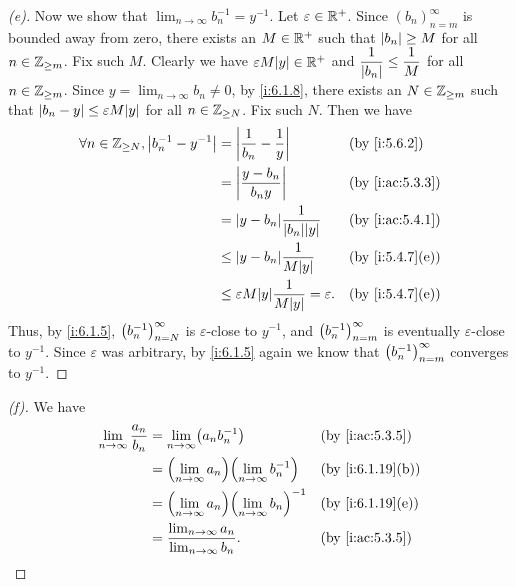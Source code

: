 \begin{proof}[(e)]
  Now we show that \(\lim_{n \to \infty} b_n^{-1} = y^{-1}\).
  Let \(\varepsilon \in \mathbb{R}^+\).
  Since \((b_n)_{n = m}^\infty\) is bounded away from zero, there exists an \(M \in \mathbb{R}^+\) such that \(\left\lvert b_n\right\rvert \geq M\) for all \(n \in \mathbb{Z}_{\geq m}\).
  Fix such \(M\).
  Clearly we have \(\varepsilon M \abs{y} \in \R^+\) and \(\dfrac{1}{\left\lvert b_n\right\rvert} \leq \dfrac{1}{M}\) for all \(n \in \mathbb{Z}_{\geq m}\).
  Since \(y = \lim_{n \to \infty} b_n \neq 0\), by \cref{i:6.1.8}, there exists an \(N \in \mathbb{Z}_{\geq m}\) such that \(\abs{b_n - y} \leq \varepsilon M \abs{y}\) for all \(n \in \mathbb{Z}_{\geq N}\).
  Fix such \(N\).
  Then we have
  \begin{align*}
    \forall n \in \Z_{\geq N}, \abs{b_n^{-1} - y^{-1}} & = \abs{\dfrac{1}{b_n} - \dfrac{1}{y}}                       &  & \by{i:5.6.2}    \\
                                                       & = \abs{\dfrac{y - b_n}{b_n y}}                              &  & \by{i:ac:5.3.3} \\
                                                       & = \abs{y - b_n}\dfrac{1}{\abs{b_n}\abs{y}}                  &  & \by{i:ac:5.4.1} \\
                                                       & \leq \abs{y - b_n}\dfrac{1}{M\abs{y}}                       &  & \by{i:5.4.7}[e] \\
                                                       & \leq \varepsilon M\abs{y}\dfrac{1}{M\abs{y}} = \varepsilon. &  & \by{i:5.4.7}[e]
  \end{align*}
  Thus, by \cref{i:6.1.5}, \(\left\lparen b_n^{-1}\right\rparen_{n = N}^\infty\) is \(\varepsilon\)-close to \(y^{-1}\), and \(\left\lparen b_n^{-1}\right\rparen_{n = m}^\infty\) is eventually \(\varepsilon\)-close to \(y^{-1}\).
  Since \(\varepsilon\) was arbitrary, by \cref{i:6.1.5} again we know that \(\left\lparen b_n^{-1}\right\rparen_{n = m}^\infty\) converges to \(y^{-1}\).
\end{proof}

\begin{proof}[(f)]
  We have
  \begin{align*}
    \lim_{n \to \infty} \dfrac{a_n}{b_n} & = \lim_{n \to \infty} \pa{a_n b_n^{-1}}                          &  & \by{i:ac:5.3.5}  \\
                                         & = \pa{\lim_{n \to \infty} a_n} \pa{\lim_{n \to \infty} b_n^{-1}} &  & \by{i:6.1.19}[b] \\
                                         & = \pa{\lim_{n \to \infty} a_n} \pa{\lim_{n \to \infty} b_n}^{-1} &  & \by{i:6.1.19}[e] \\
                                         & = \dfrac{\lim_{n \to \infty} a_n}{\lim_{n \to \infty} b_n}.      &  & \by{i:ac:5.3.5}
  \end{align*}
\end{proof}

